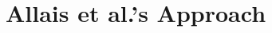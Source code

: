 \documentclass[sigplan,review,fleqn]{acmart}
\begin{document}
%



\section{Allais et al.'s Approach}
\label{sec:recap}
\end{document}
